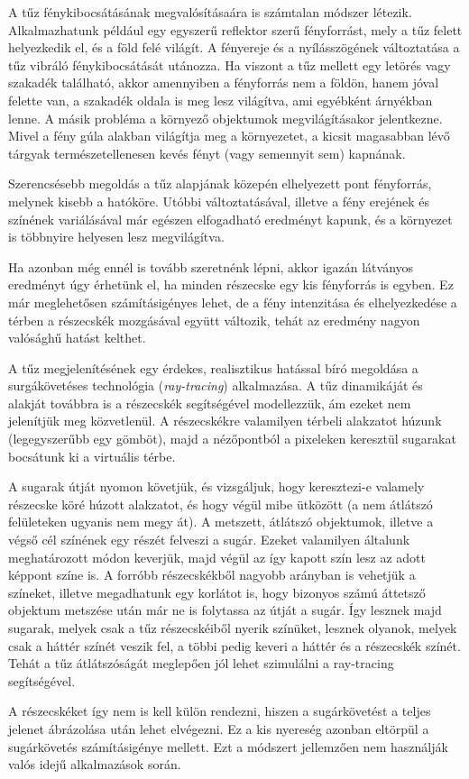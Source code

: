 A tűz fénykibocsátásának megvalósításaára is számtalan módszer létezik. Alkalmazhatunk például egy egyszerű reflektor szerű fényforrást, mely a tűz felett helyezkedik el, és a föld felé világít. A fényereje és a nyílásszögének változtatása a tűz vibráló fénykibocsátását utánozza. Ha viszont a tűz mellett egy letörés vagy szakadék található, akkor amennyiben a fényforrás nem a földön, hanem jóval felette van, a szakadék oldala is meg lesz világítva, ami egyébként árnyékban lenne. A másik probléma a környező objektumok megvilágításakor jelentkezne. Mivel a fény gúla alakban világítja meg a környezetet, a kicsit magasabban lévő tárgyak természetellenesen kevés fényt (vagy semennyit sem) kapnának.

Szerencsésebb megoldás a tűz alapjának közepén elhelyezett pont fényforrás, melynek kisebb a hatóköre. Utóbbi változtatásával, illetve a fény erejének és színének variálásával már egészen elfogadható eredményt kapunk, és a környezet is többnyire helyesen lesz megvilágítva.

Ha azonban még ennél is tovább szeretnénk lépni, akkor igazán látványos eredményt úgy érhetünk el, ha minden részecske egy kis fényforrás is egyben. Ez már meglehetősen számításigényes lehet, de a fény intenzitása és elhelyezkedése a térben a részecskék mozgásával együtt változik, tehát az eredmény nagyon valósághű hatást kelthet.

A tűz megjelenítésének egy érdekes, realisztikus hatással bíró megoldása a surgákövetéses technológia (\textit{ray-tracing}) alkalmazása. A tűz dinamikáját és alakját továbbra is a részecskék segítségével modellezzük, ám ezeket nem jelenítjük meg közvetlenül. A részecskékre valamilyen térbeli alakzatot húzunk (legegyszerűbb egy gömböt), majd a nézőpontból a pixeleken keresztül sugarakat bocsátunk ki a virtuális térbe. 

A sugarak útját nyomon követjük, és vizsgáljuk, hogy keresztezi-e valamely részecske köré húzott alakzatot, és hogy végül mibe ütközött (a nem átlátszó felületeken ugyanis nem megy át). A metszett, átlátszó objektumok, illetve a végső cél színének egy részét felveszi a sugár. Ezeket valamilyen általunk meghatározott módon keverjük, majd végül az így kapott szín lesz az adott képpont színe is. A forróbb részecskékből nagyobb arányban is vehetjük a színeket, illetve megadhatunk egy korlátot is, hogy bizonyos számú áttetsző objektum metszése után már ne is folytassa az útját a sugár. Így lesznek majd sugarak, melyek csak a tűz részecskéiből nyerik színüket, lesznek olyanok, melyek csak a háttér színét veszik fel, a többi pedig keveri a háttér és a részecskék színét. Tehát a tűz átlátszóságát meglepően jól lehet szimulálni a ray-tracing segítségével. 

A részecskéket így nem is kell külön rendezni, hiszen a sugárkövetést a teljes jelenet ábrázolása után lehet elvégezni. Ez a kis nyereség azonban eltörpül a sugárkövetés számításigénye mellett. Ezt a módszert jellemzően nem használják valós idejű alkalmazások során.

















